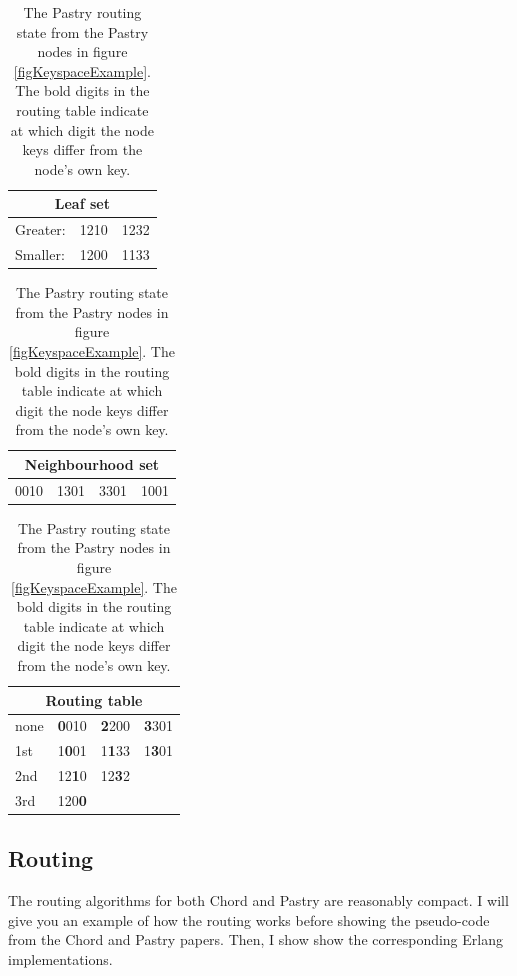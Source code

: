 \begin{table}[!htb]
\caption{The Pastry routing state from the Pastry nodes in figure \ref{figKeyspaceExample}. The bold digits in the routing table indicate at which digit the node keys differ from the node's own key.}
\begin{center}
\begin{tabular}{ | l | l | l | }
  \hline
  \multicolumn{3}{|c|}{Leaf set} \\ 
  \hline
  \hline                       
  Greater: & 1210 & 1232 \\
  \hline                       
  Smaller: & 1200 & 1133 \\
  \hline                       
\end{tabular}
\begin{tabular}{ | l | l | l | l | }
  \hline                       
  \multicolumn{4}{|c|}{Neighbourhood set} \\ 
  \hline
  \hline                       
  0010 & 1301 & 3301 & 1001 \\
  \hline                       
\end{tabular}
\begin{tabular}{ | l | l | l | l | }
  \hline                       
  \multicolumn{4}{|c|}{Routing table} \\ 
  \hline
  \hline                       
  \cellcolor{green} none & \textbf{0}010 & \textbf{2}200 & \textbf{3}301 \\
  \hline                       
  \cellcolor{green} 1st & 1\textbf{0}01 & 1\textbf{1}33 & 1\textbf{3}01 \\
  \hline                       
  \cellcolor{green} 2nd & 12\textbf{1}0 & 12\textbf{3}2 & \\
  \hline                       
  \cellcolor{green} 3rd & 120\textbf{0} & & \\
  \hline                       
\end{tabular}
\end{center}
\label{tablePastryRoutingTableImpl}
\end{table}

\subsection{Routing}
The routing algorithms for both Chord and Pastry are reasonably compact. I will give you an example of how the routing works before showing the pseudo-code from the Chord \cite{chord} and Pastry \cite{pastry} papers. Then, I show show the corresponding Erlang implementations.

